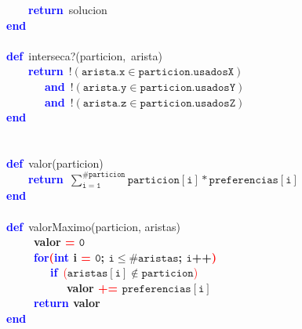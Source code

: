 \mbox{}\ \ \ \ \textbf{\textcolor{Blue}{return}}\ solucion \\
\mbox{}\textbf{\textcolor{Blue}{end}} \\
\mbox{} \\
\mbox{}\textbf{\textcolor{Blue}{def}}\ interseca?\textcolor{BrickRed}{(}particion\textcolor{BrickRed}{,}\ arista\textcolor{BrickRed}{)} \\
\mbox{}\ \ \ \ \textbf{\textcolor{Blue}{return}}\ $\mathtt{!(arista.x \in particion.usadosX)}$ \\
\mbox{}\ \ \ \ \ \ \ \textbf{\textcolor{Blue}{and}}\ $\mathtt{!(arista.y \in particion.usadosY)}$ \\
\mbox{}\ \ \ \ \ \ \ \textbf{\textcolor{Blue}{and}}\ $\mathtt{!(arista.z \in particion.usadosZ)}$ \\
\mbox{}\textbf{\textcolor{Blue}{end}} \\
\mbox{} \\
\mbox{} \\
\mbox{}\textbf{\textcolor{Blue}{def}}\ valor\textcolor{BrickRed}{(}particion\textcolor{BrickRed}{)} \\
\mbox{}\ \ \ \ \textbf{\textcolor{Blue}{return}}\ $\mathtt{\sum_{\mathtt{i=1}}^{\mathtt{\#particion}} \mathtt{particion[i]} * \mathtt{preferencias[i]}} $ \\
\mbox{}\textbf{\textcolor{Blue}{end}} \\
\mbox{} \\
\mbox{}\textbf{\textcolor{Blue}{def}}\ valorMaximo\textcolor{BrickRed}{(}particion\textcolor{BrickRed}{,} aristas\textcolor{BrickRed}{)} \\
\mbox{}\ \ \ \ \ \textbf{valor \textcolor{Red}{=} $\mathtt{0}$}\\
\mbox{}\ \ \ \ \ \textbf{\textcolor{Blue}{for}\textcolor{Red}{(}\textcolor{Blue}{int} i \textcolor{Red}{=} $\mathtt{0}$; 
$\mathtt{i \le \#aristas}$; $\mathtt{i}$++\textcolor{Red}{)}}\\
\mbox{}\ \ \ \ \ \ \ \ \textbf{\textcolor{Blue}{if}}\ \textcolor{Red}{(}$\mathtt{aristas[i] \notin particion}$\textcolor{Red}{)} \\
\mbox{}\ \ \ \ \ \ \ \ \ \ \ \textbf{valor \textcolor{Red}{+=} $\mathtt{preferencias[i]}$}\\
\mbox{}\ \ \ \ \ \textbf{\textcolor{Blue}{return} valor}\\
\mbox{}\textbf{\textcolor{Blue}{end}} \\
\mbox{}
